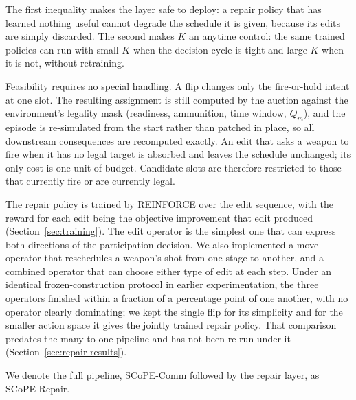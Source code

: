 The first inequality makes the layer safe to deploy: a repair policy that has learned nothing useful cannot degrade the schedule it is given, because its edits are simply discarded. The second makes $K$ an anytime control: the same trained policies can run with small $K$ when the decision cycle is tight and large $K$ when it is not, without retraining.

Feasibility requires no special handling. A flip changes only the fire-or-hold intent at one slot. The resulting assignment is still computed by the auction against the environment's legality mask (readiness, ammunition, time window, $Q_m$), and the episode is re-simulated from the start rather than patched in place, so all downstream consequences are recomputed exactly. An edit that asks a weapon to fire when it has no legal target is absorbed and leaves the schedule unchanged; its only cost is one unit of budget. Candidate slots are therefore restricted to those that currently fire or are currently legal.

The repair policy is trained by REINFORCE over the edit sequence, with the reward for each edit being the objective improvement that edit produced (Section~\ref{sec:training}). The edit operator is the simplest one that can express both directions of the participation decision. We also implemented a move operator that reschedules a weapon's shot from one stage to another, and a combined operator that can choose either type of edit at each step. Under an identical frozen-construction protocol in earlier experimentation, the three operators finished within a fraction of a percentage point of one another, with no operator clearly dominating; we kept the single flip for its simplicity and for the smaller action space it gives the jointly trained repair policy. That comparison predates the many-to-one pipeline and has not been re-run under it (Section~\ref{sec:repair-results}).

We denote the full pipeline, SCoPE-Comm followed by the repair layer, as SCoPE-Repair.

